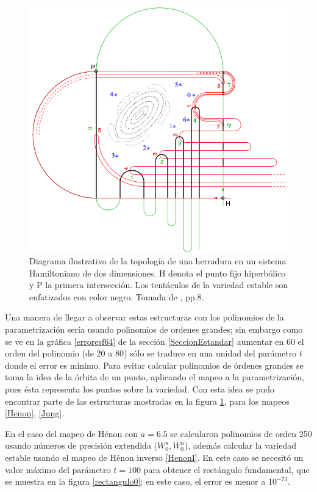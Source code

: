 \begin{figure}[H]
\centering
\includegraphics[scale=0.35]{herradura}
\caption{Diagrama ilustrativo de la topología de una herradura en un sistema Hamiltoniano de dos dimensiones. H denota el punto fijo hiperbólico y P la primera intersección. Los tentáculos de la variedad estable son enfatizados con color negro. Tomada de \cite{Merlo}, pp.8.}
\label{herradura}
\end{figure}

Una manera de llegar a observar estas estructuras con los polinomios de la pa\-ra\-me\-tri\-za\-ción sería usando polinomios de ordenes grandes; sin embargo como se ve en la gráfica \ref{erroresf64} de la sección \ref{SeccionEstandar} aumentar en 60 el orden del polinomio (de 20 a 80) sólo se traduce en una unidad del parámetro $t$ donde el error es mínimo. Para evitar calcular polinomios de órdenes grandes se toma la idea de la órbita de un punto, aplicando el mapeo a la parametrización, pues ésta representa los puntos sobre la variedad. Con esta idea se pudo encontrar parte de las estructuras mostradas en la figura \ref{herradura}, para los mapeos \eqref{Henon}, \eqref{Jung}.


En el caso del mapeo de Hénon con $a=6.5$ se calcularon polinomios de orden 250 usando números de precisión extendida ($W_{0}^{s},W_{0}^{u}$), además calcular la variedad estable usando el mapeo de Hénon inverso \eqref{HenonI}. En este caso se necesitó un valor máximo del parámetro $t=100$ para obtener el rectángulo fundamental, que se muestra en la figura \ref{rectangulo0}; en este caso, el error es menor a $10^{-73}$.

